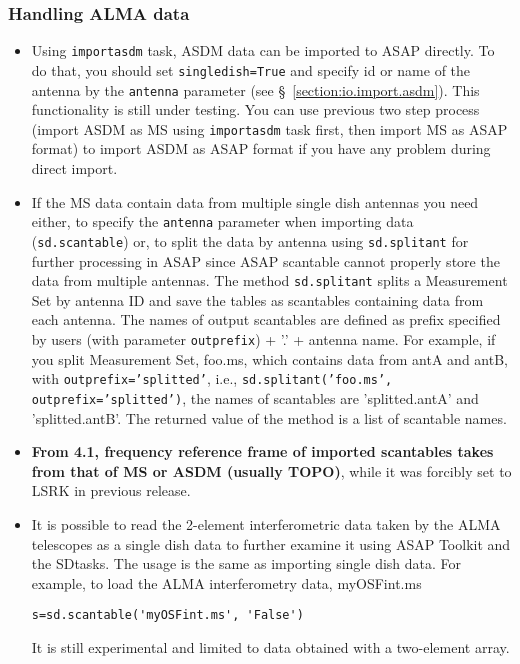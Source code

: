 \subsubsection{Handling ALMA data}

\begin{itemize}
\item Using {\tt importasdm} task, ASDM data can be imported to ASAP directly.
To do that, you should set {\tt singledish=True} and specify id or name of 
the antenna by the {\tt antenna} parameter 
(see \S~\ref{section:io.import.asdm}). This functionality is still under 
testing. You can use previous two step process (import ASDM as MS using 
{\tt importasdm} task first, then import MS as ASAP format) to import ASDM 
as ASAP format if you have any problem during direct import. 

\item If the MS data contain data from multiple single dish antennas you need either, to 
specify the {\tt antenna} parameter when importing data ({\tt sd.scantable}) or,
 to split the data by antenna using {\tt sd.splitant} for further processing in ASAP 
since ASAP scantable cannot properly store the data from multiple antennas.
The method {\tt sd.splitant} splits a Measurement Set by antenna ID
and save the tables as scantables containing data from each antenna. 
The names of output scantables are defined as prefix specified by
users (with parameter {\tt outprefix}) + '.' + antenna name. For
example, if you split Measurement Set, foo.ms, which contains data
from antA and antB, with {\tt outprefix='splitted'}, i.e., 
{\tt sd.splitant('foo.ms', outprefix='splitted')}, the names of scantables
are 'splitted.antA' and 'splitted.antB'.  
The returned value of the method is a list of scantable names. 
\item {\bf From 4.1, frequency reference frame of imported scantables 
takes from that of MS or ASDM (usually TOPO)}, 
while it was forcibly set to LSRK in previous release.
\item It is possible to read the 2-element interferometric
data taken by the ALMA telescopes 
as a single dish data to further examine it using ASAP Toolkit and
the SDtasks. The usage is the same as importing single
dish data. 
For example, to load the ALMA interferometry data, myOSFint.ms
\begin{verbatim} 
s=sd.scantable('myOSFint.ms', 'False')
\end{verbatim} 
It is still experimental and limited to data obtained with a
two-element array.


\end{itemize}
